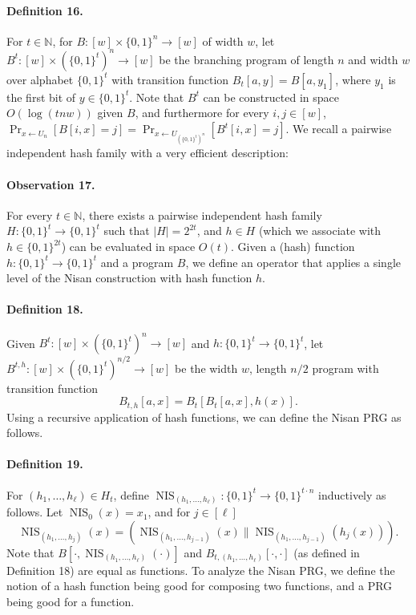 \documentclass[10pt,a4paper]{article}
\begin{document}
\paragraph{Definition 16.} For $t\in\mathbb N$, for $B:[w]\times\{0,1\}^n\to[w]$ of width $w$, let $B^t:[w]\times(\{0,1\}^t)^n\to[w]$ be the branching program of length $n$ and width $w$ over alphabet $\{0,1\}^t$ with transition function $B_t[a,y]=B[a,y_1]$, where $y_1$ is the first bit of $y\in\{0,1\}^t$. Note that $B^t$ can be constructed in space $O(\log(tnw))$ given $B$, and furthermore for every $i,j\in[w]$, $\Pr_{x\leftarrow U_n}[B[i,x]=j]=\Pr_{x\leftarrow U_{(\{0,1\}^t)^n}}[B^t[i,x]=j]$.
We recall a pairwise independent hash family with a very efficient description:
\paragraph{Observation 17.} For every $t\in\mathbb N$, there exists a pairwise independent hash family $H:\{0,1\}^t\to\{0,1\}^t$ such that $|H|=2^{2t}$, and $h\in H$ (which we associate with $h\in\{0,1\}^{2t}$) can be evaluated in space $O(t)$.
Given a (hash) function $h:\{0,1\}^t\to\{0,1\}^t$ and a program $B$, we define an operator that applies a single level of the Nisan construction with hash function $h$.
\paragraph{Definition 18.} Given $B^t:[w]\times(\{0,1\}^t)^n\to[w]$ and $h:\{0,1\}^t\to\{0,1\}^t$, let $B^{t,h}:[w]\times(\{0,1\}^t)^{n/2}\to[w]$ be the width $w$, length $n/2$ program with transition function
\[B_{t,h}[a,x]=B_t[B_t[a,x],h(x)].\]
Using a recursive application of hash functions, we can define the Nisan PRG as follows.
\paragraph{Definition 19.} For $(h_1,\ldots,h_\ell)\in H_t$, define $\operatorname{NIS}_{(h_1,\ldots,h_\ell)}:\{0,1\}^t\to\{0,1\}^{t\cdot n}$ inductively as follows. Let $\operatorname{NIS}_0(x)=x_1$, and for $j\in[\ell]$
\[\operatorname{NIS}_{(h_1,\ldots,h_j)}(x)=(\operatorname{NIS}_{(h_1,\ldots,h_{j-1})}(x)\|\operatorname{NIS}_{(h_1,\ldots,h_{j-1})}(h_j(x))).\]
Note that $B[\cdot,\operatorname{NIS}_{(h_1,\ldots,h_\ell)}(\cdot)]$ and $B_{t,(h_1,\ldots,h_\ell)}[\cdot,\cdot]$ (as defined in Definition 18) are equal as functions.
To analyze the Nisan PRG, we define the notion of a hash function being good for composing two functions, and a PRG being good for a function.
\end{document}
